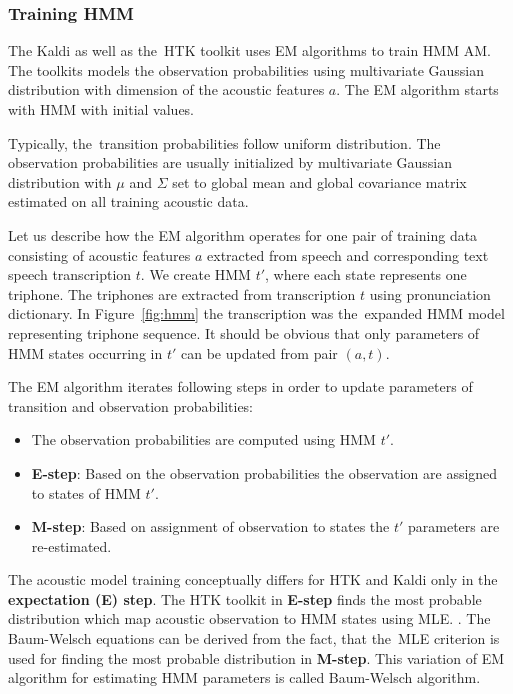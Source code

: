 {\subsubsection*{Training \ac{HMM}}
\label{sub:trainhmm}

The Kaldi as well as the~\ac{HTK} toolkit uses \acl{EM} algorithms to train \ac{HMM} \acl{AM}.
The toolkits models the observation probabilities using multivariate Gaussian distribution 
with dimension of the acoustic features $a$.
The \ac{EM} algorithm starts with \ac{HMM} with initial values. 

Typically, the~transition probabilities follow uniform distribution.
The observation probabilities are usually initialized by multivariate Gaussian distribution
with $\mu$ and $\Sigma$ set to global mean and global covariance matrix 
estimated on all training acoustic data.

Let us describe how the \ac{EM} algorithm operates for one pair
of training data consisting of acoustic features $a$ extracted from speech
and corresponding text speech transcription $t$.
We create \ac{HMM} $t'$, where each state represents one triphone. 
The triphones are extracted from transcription $t$ using pronunciation dictionary.
In Figure~\ref{fig:hmm} the transcription  
was the~expanded \ac{HMM} model representing triphone sequence.
It should be obvious that only parameters of HMM states 
occurring in $t'$ can be updated from pair $(a, t)$.

The \ac{EM} algorithm iterates following steps in order 
to update parameters of transition and observation probabilities:
\begin{itemize}
    \item The observation probabilities are computed using \ac{HMM} $t'$. 
    \item {\bf E-step}: Based on the observation probabilities the observation are assigned to states of \ac{HMM} $t'$. 
    \item {\bf M-step}: Based on assignment of observation to states the $t'$ parameters are re-estimated. 
\end{itemize}

The acoustic model training conceptually differs for \ac{HTK} and Kaldi only in the {\bf expectation (E) step}.
The \ac{HTK} toolkit in {\bf E-step} finds the most probable distribution 
which map acoustic observation to \ac{HMM} states using \ac{MLE}. . 
The Baum-Welsch equations can be derived from the fact, 
that the~\ac{MLE} criterion is used for finding the most probable distribution in {\bf M-step}.\cite{huang2001spoken}
This variation of \ac{EM} algorithm for estimating \ac{HMM} parameters is called Baum-Welsch algorithm.

}
